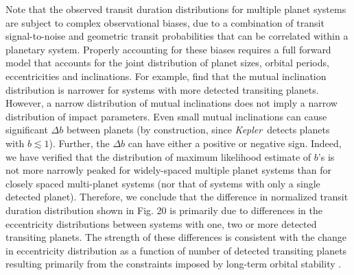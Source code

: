 \documentclass{aastex62}
\newcommand{\ik}{{\it Kepler~}}
\begin{document}
Note that the observed transit duration distributions for multiple planet systems are subject to complex observational biases, due to a combination of transit signal-to-noise and geometric transit probabilities that can be correlated within a planetary system.  Properly accounting for these biases requires a full forward model that accounts for the joint distribution of planet sizes, orbital periods, eccentricities and inclinations. For example, \cite{He:2019,He:2020} %
find that the mutual inclination distribution is narrower for systems with more detected transiting planets.  However, a narrow distribution of mutual inclinations does not imply a narrow distribution of impact parameters.  Even small mutual inclinations can cause significant $\Delta b$ between planets (by construction, since \ik detects planets with $b\lesssim1$).  Further, the $\Delta b$ can have either a positive or negative sign.  Indeed, we have verified that the distribution of maximum likelihood estimate of $b$'s is not more narrowly peaked for widely-spaced multiple planet systems than for closely spaced multi-planet systems (nor that of systems with only a single detected planet).  Therefore, we conclude that the difference in normalized transit duration distribution shown in Fig. 20 is primarily due to differences in the eccentricity distributions between systems with one, two or more detected transiting planets.  The strength of these differences is consistent with the change in eccentricity distribution as a function of number of detected transiting planets resulting primarily from the constraints imposed by long-term orbital stability \citep{He:2020}. %
\end{document}
